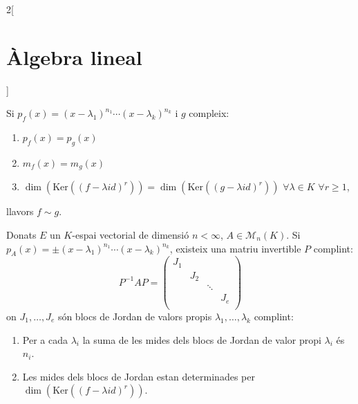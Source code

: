 \documentclass[class=article,10pt,crop=false]{standalone}
\begin{document}
\begin{multicols}{2}[\section{Àlgebra lineal}]
\begin{theorem}
\end{theorem}
\begin{theorem}
Si $p_f(x)=(x-\lambda_1)^{n_1}\cdots(x-\lambda_k)^{n_k}$ i $g$ compleix:
\begin{enumerate}
    \item $p_f(x)=p_g(x)$
    \item $m_f(x)=m_g(x)$
    \item $\dim(\text{Ker}((f-\lambda id)^r))=\dim(\text{Ker}((g-\lambda id)^r))$ $\forall\lambda\in K$ $\forall r\geq 1$,
\end{enumerate}
llavors $f\sim g$.
\end{theorem}
\begin{prop}
Donats $E$ un $K$-espai vectorial de dimensió $n<\infty$, $A\in\mathcal{M}_n(K)$. Si $p_A(x)=\pm(x-\lambda_1)^{n_1}\cdots(x-\lambda_k)^{n_k}$, existeix una matriu invertible $P$ complint: $$P^{-1}AP=\begin{pmatrix}
J_1 & & & \\
& J_2 & & \\
& & \ddots & \\
& & & J_e \\
\end{pmatrix}$$
on $J_1,\ldots,J_e$ són blocs de Jordan de valors propis $\lambda_1,\ldots,\lambda_k$ complint:
\begin{enumerate}
    \item Per a cada $\lambda_i$ la suma de les mides dels blocs de Jordan de valor propi $\lambda_i$ és $n_i$.
    \item Les mides dels blocs de Jordan estan determinades per $\dim(\text{Ker}((f-\lambda id)^r))$.
\end{enumerate}
\end{prop}

\end{multicols}
\end{document}
